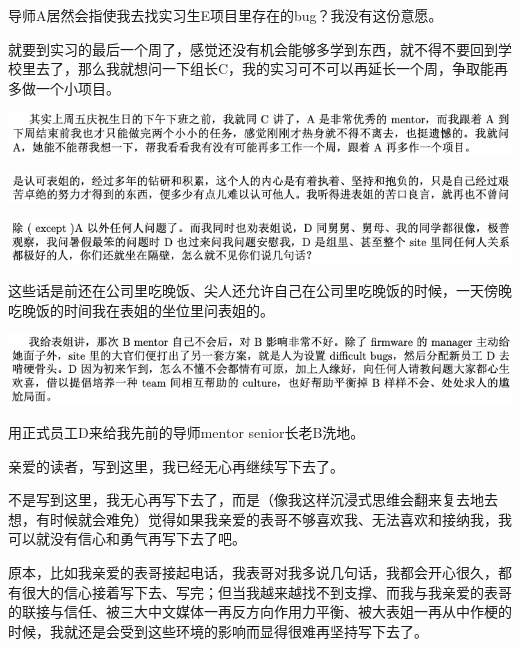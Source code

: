 \documentclass[9pt, b5paper]{article}
\begin{document}
导师A居然会指使我去找实习生E项目里存在的bug？我没有这份意愿。 

就要到实习的最后一个周了，感觉还没有机会能够多学到东西，就不得不要回到学校里去了，那么我就想问一下组长C，我的实习可不可以再延长一个周，争取能再多做一个小项目。 

\begin{center}
\includegraphics[width=.9\linewidth]{./pic/backups_plans_20210514_115101.png}
\end{center}

\begin{center}
\includegraphics[width=.9\linewidth]{./pic/backups_plans_20210514_115223.png}
\end{center}

\begin{center}
\includegraphics[width=.9\linewidth]{./pic/backups_plans_20210514_115233.png}
\end{center}

这些话是前还在公司里吃晚饭、尖人还允许自己在公司里吃晚饭的时候，一天傍晚吃晚饭的时间我在表姐的坐位里问表姐的。 

\begin{center}
\includegraphics[width=.9\linewidth]{./pic/backups_plans_20210514_115523.png}
\end{center}

用正式员工D来给我先前的导师mentor senior长老B洗地。 

亲爱的读者，写到这里，我已经无心再继续写下去了。

不是写到这里，我无心再写下去了，而是（像我这样沉浸式思维会翻来复去地去想，有时候就会难免）觉得如果我亲爱的表哥不够喜欢我、无法喜欢和接纳我，我可以就没有信心和勇气再写下去了吧。 

原本，比如我亲爱的表哥接起电话，我表哥对我多说几句话，我都会开心很久，都有很大的信心接着写下去、写完；但当我越来越找不到支撑、而我与我亲爱的表哥的联接与信任、被三大中文媒体一再反方向作用力平衡、被大表姐一再从中作梗的时候，我就还是会受到这些环境的影响而显得很难再坚持写下去了。 
\end{document}
